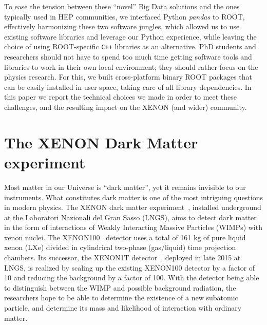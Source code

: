 \documentclass[a4paper]{jpconf}
\begin{document}
To ease the tension between these ``novel'' Big Data solutions and the ones typically used in HEP communities,
we interfaced Python \textit{pandas} to ROOT, effectively 
harmonizing these two software jungles, which allowed us to use existing software libraries and leverage our Python experience, while 
leaving the choice of using ROOT-specific \texttt{C++} libraries as an alternative.
PhD students and researchers should not have to spend too much time getting software tools and libraries to work in their own local environment; they 
should rather focus on the physics research. For this, 
we built cross-platform binary ROOT packages that can be easily installed in user space, taking care of all library dependencies.
In this paper we report the technical choices we made in order to meet these challenges, and the resulting impact on the XENON (and wider) community.

\section{The XENON Dark Matter experiment}
Most matter in our Universe is ``dark matter'', yet it remains invisible to our instruments. What
constitutes dark matter is one of the most intriguing questions in modern physics. 
The XENON dark matter experiment~\cite{Aprile2012573},
installed underground at the Laboratori Nazionali del Gran Sasso (LNGS),
aims to detect dark matter in the form of interactions of Weakly 
Interacting Massive Particles (WIMPs) with xenon nuclei.
The XENON100~\cite{aprile2014analysis} detector uses a total of 161 kg of 
pure liquid xenon (LXe) divided in cylindrical two-phase  (gas/liquid)  time  projection  chambers.
Its successor, the XENON1T detector~\cite{aprile2013xenon1t}, deployed in late 2015 at LNGS, is 
realized by scaling up the existing XENON100 detector by a factor of 10 and reducing the background by a 
factor of 100. With the detector being able to distinguish between the WIMP and possible 
background radiation, the researchers hope to be able to determine the existence of a new subatomic 
particle, and determine its mass and likelihood of interaction with ordinary matter.
\end{document}
